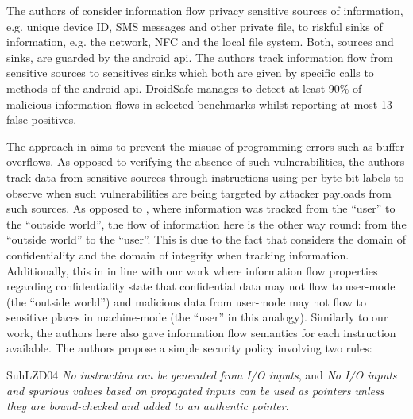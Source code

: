 The authors of \cite{GordonKPGNR15} consider information flow privacy sensitive sources of information, e.g. unique device ID, SMS messages and other private file, to riskful sinks of information, e.g. the network, NFC and the local file system.
Both, sources and sinks, are guarded by the android \gls{api}.
The authors track information flow from sensitive sources to sensitives sinks which both are given by specific calls to methods of the android \gls{api}.
DroidSafe manages to detect at least 90\% of malicious information flows in selected benchmarks whilst reporting at most 13 false positives.

The approach in \cite{SuhLZD04} aims to prevent the misuse of programming errors such as buffer overflows.
As opposed to verifying the absence of such vulnerabilities, the authors track data from sensitive sources through instructions using per-byte bit labels to observe when such vulnerabilities are being targeted by attacker payloads from such sources.
As opposed to \cite{GordonKPGNR15}, where information was tracked from the \enquote{user} to the \enquote{outside world}, the flow of information here is the other way round: from the \enquote{outside world} to the \enquote{user}.
This is due to the fact that \cite{GordonKPGNR15} considers the domain of confidentiality and \cite{SuhLZD04} the domain of integrity when tracking information.
Additionally, this in in line with our work where information flow properties regarding confidentiality state that confidential data may not flow to user-mode (the \enquote{outside world}) and malicious data from user-mode may not flow to sensitive places in machine-mode (the \enquote{user} in this analogy).
Similarly to our work, the authors here also gave information flow semantics for each instruction available.
The authors propose a simple security policy involving two rules:
\begin{displaycquote}{SuhLZD04}
    \textit{No instruction can be generated from I/O inputs}, and \textit{No I/O inputs and spurious values based on propagated inputs can be used as pointers unless they are bound-checked and added to an authentic pointer}.
\end{displaycquote}

